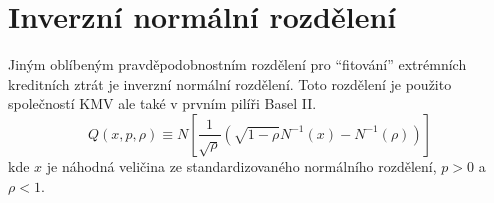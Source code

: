 \section{Inverzní normální rozdělení}

Jiným oblíbeným pravděpodobnostním rozdělení pro ``fitování'' extrémních kreditních ztrát je inverzní normální rozdělení. Toto rozdělení je použito společností KMV ale také v prvním pilíři Basel II.
\begin{equation}
Q(x, p, \rho) \equiv N \left[\frac{1}{\sqrt{\rho}}\left(\sqrt{1 - \rho} N^{-1}(x)-N^{-1}(\rho)\right)\right]
\end{equation}
kde $x$ je náhodná veličina ze standardizovaného normálního rozdělení, $p>0$ a $\rho<1$.
